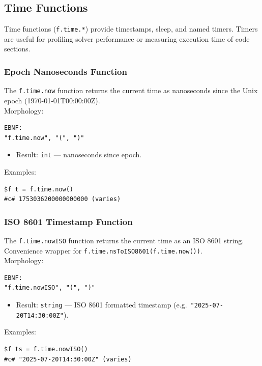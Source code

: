 \subsection{Time Functions}

Time functions (\texttt{f.time.*}) provide timestamps, sleep, and named timers. Timers are useful for profiling solver performance or measuring execution time of code sections.

\subsubsection{Epoch Nanoseconds Function}
The \texttt{f.time.now} function returns the current time as nanoseconds since the Unix epoch (1970-01-01T00:00:00Z). \\
Morphology:
\begin{verbatim}
EBNF:
"f.time.now", "(", ")"
\end{verbatim}
\begin{itemize}
\item Result: \texttt{int} --- nanoseconds since epoch.
\end{itemize}
Examples:
\begin{verbatim}
$f t = f.time.now()
#c# 1753036200000000000 (varies)
\end{verbatim}

\subsubsection{ISO 8601 Timestamp Function}
The \texttt{f.time.nowISO} function returns the current time as an ISO 8601 string. Convenience wrapper for \texttt{f.time.nsToISO8601(f.time.now())}. \\
Morphology:
\begin{verbatim}
EBNF:
"f.time.nowISO", "(", ")"
\end{verbatim}
\begin{itemize}
\item Result: \texttt{string} --- ISO 8601 formatted timestamp (e.g.\ \texttt{"2025-07-20T14:30:00Z"}).
\end{itemize}
Examples:
\begin{verbatim}
$f ts = f.time.nowISO()
#c# "2025-07-20T14:30:00Z" (varies)
\end{verbatim}

